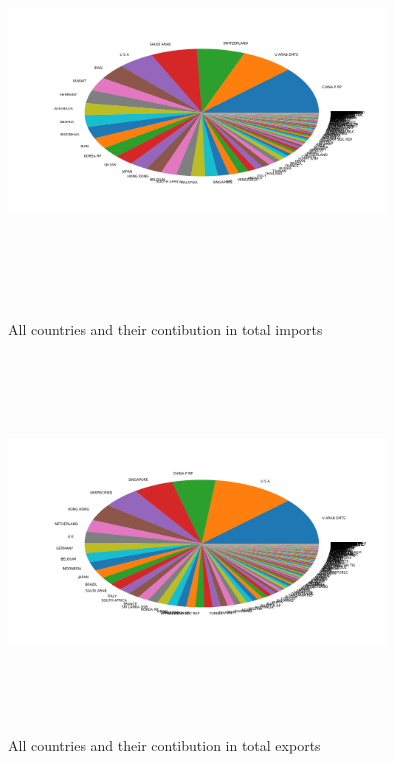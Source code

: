 \documentclass[12pt]{article}
\begin{document}
\begin{figure}[H]
	\centering
	\includegraphics[height=10cm,width=10cm]{image_1.jpg}
	\caption{All countries and their contibution in total imports}
	\label{All countries and their contibution in total imports}
	\includegraphics[height=10cm,width=10cm]{image_2.jpg}
	\caption{All countries and their contibution in total exports}
	\label{All countries and their contibution in total exports}
\end{figure}
\pagebreak
\end{document}
